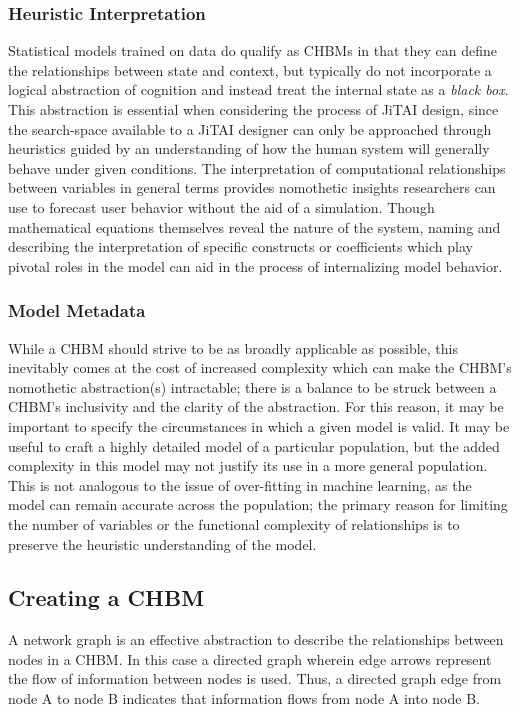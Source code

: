 \documentclass[runningheads,a4paper]{llncs}
\begin{document}
\subsubsection{Heuristic Interpretation}
Statistical models trained on data do qualify as CHBMs in that they can define the relationships between state and context, but typically do not incorporate a logical abstraction of cognition and instead treat the internal state as a \emph{black box}.
This abstraction is essential when considering the process of JiTAI design, since the search-space available to a JiTAI designer can only be approached through heuristics guided by an understanding of how the human system will generally behave under given conditions.
The interpretation of computational relationships between variables in general terms provides nomothetic insights researchers can use to forecast user behavior without the aid of a simulation.
Though mathematical equations themselves reveal the nature of the system, naming and describing the interpretation of specific constructs or coefficients which play pivotal roles in the model can aid in the process of internalizing model behavior.
\subsubsection{Model Metadata}
While a CHBM should strive to be as broadly applicable as possible, this inevitably comes at the cost of increased complexity which can make the CHBM's nomothetic abstraction(s) intractable; there is a balance to be struck between a CHBM's inclusivity and the clarity of the abstraction.
For this reason, it may be important to specify the circumstances in which a given model is valid.
It may be useful to craft a highly detailed model of a particular population, but the added complexity in this model may not justify its use in a more general population.
This is not analogous to the issue of over-fitting in machine learning, as the model can remain accurate across the population; the primary reason for limiting the number of variables or the functional complexity of relationships is to preserve the heuristic understanding of the model.

\subsection{Creating a CHBM}
A network graph is an effective abstraction to describe the relationships between nodes in a CHBM.
In this case a directed graph wherein edge arrows represent the flow of information between nodes is used.
Thus, a directed graph edge from node A to node B indicates that information flows from node A into node B. 
\end{document}
